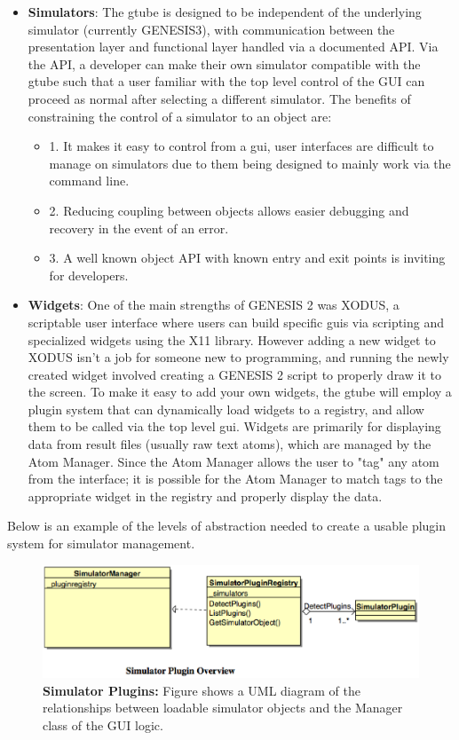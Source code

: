 \documentclass[12pt]{article}
\begin{document}
\begin{itemize}
\item[] {\bf Simulators}: The gtube is designed to be independent of the underlying simulator (currently GENESIS3), with communication between the presentation layer and functional layer handled via a documented API. Via the API, a developer can make their own simulator compatible with the gtube such that a user familiar with the top level control of the GUI can proceed as normal after selecting a different simulator. The benefits of constraining the control of a simulator to an object are: 

	\begin{itemize}
		\item[] 1. It makes it easy to control from a gui, user interfaces are difficult to manage on simulators due to them being designed to mainly work via the command line.
		\item[] 2. Reducing coupling between objects allows easier debugging and recovery in the event of an error.
		\item[] 3. A well known object API with known entry and exit points is inviting for developers.
	\end{itemize}
		
	
\item[] {\bf Widgets}: One of the main strengths of GENESIS 2 was XODUS, a scriptable user interface where users can build specific guis via scripting and specialized widgets using the X11 library. However adding a new widget to XODUS isn't a job for someone new to programming, and running the newly created widget involved creating a GENESIS 2 script to properly draw it to the screen. To make it easy to add your own widgets, the gtube will employ a plugin system that can dynamically load widgets to a registry, and allow them to be called via the top level gui. 
	Widgets are primarily for displaying data from result files (usually raw text atoms), which are managed by the Atom Manager. Since the Atom Manager allows the user to "tag" any atom from the interface; it is possible for the Atom Manager to match tags to the appropriate widget in the registry and properly display the data. 

\end{itemize}

Below is an example of the levels of abstraction needed to create a usable plugin system for simulator management.

\begin{figure}[ht]
   \centering
   \includegraphics[scale=0.6]{figures/SimulatorPluginOverview.eps}
   \caption{{\bf Simulator Plugins:} Figure shows a UML diagram of the relationships between loadable simulator objects and the Manager class of the GUI logic.}
   \label{fig:Simulator Plugin Overview}
\end{figure}
\end{document}
